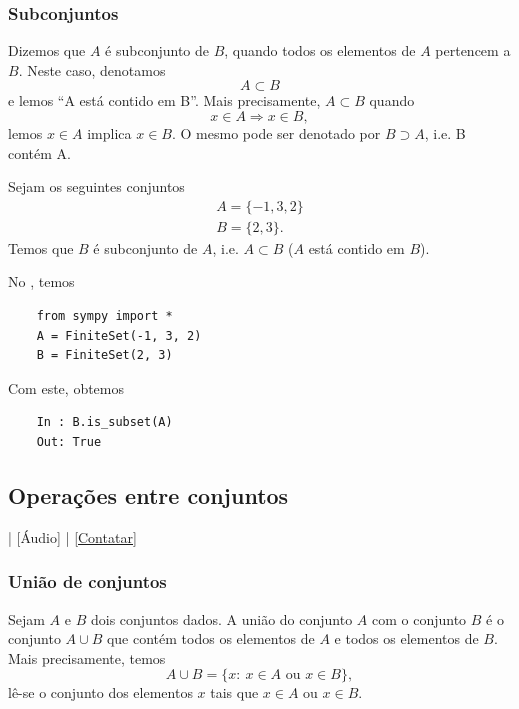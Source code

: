 \subsubsection{Subconjuntos}

Dizemos que $A$ é subconjunto de $B$, quando todos os elementos de $A$ pertencem a $B$. Neste caso, denotamos
\begin{equation}
  A \subset B
\end{equation}
e lemos ``A está contido em B''. Mais precisamente, $A\subset B$ quando
\begin{equation}
  x\in A \Rightarrow x\in B,
\end{equation}
lemos $x\in A$ implica $x\in B$. O mesmo pode ser denotado por $B\supset A$, i.e. B contém A.

\begin{ex}
  Sejam os seguintes conjuntos
  \begin{gather}
    A = \{-1, 3, 2\}\\
    B = \{2, 3\}.
  \end{gather}
  Temos que $B$ é subconjunto de $A$, i.e. $A\subset B$ ($A$ está contido em $B$).
    
  \ifispython
  No \python, temos
  \begin{lstlisting}
    from sympy import *
    A = FiniteSet(-1, 3, 2)
    B = FiniteSet(2, 3)
  \end{lstlisting}
  Com este, obtemos
  \begin{lstlisting}
    In : B.is_subset(A)
    Out: True
  \end{lstlisting}
  \fi
\end{ex}

\subsection{Operações entre conjuntos}

\begin{flushright}
  [Vídeo] | [Áudio] | \href{https://phkonzen.github.io/notas/contato.html}{[Contatar]}
\end{flushright}

\subsubsection{União de conjuntos}

Sejam $A$ e $B$ dois conjuntos dados. A união do conjunto $A$ com o conjunto $B$ é o conjunto $A\cup B$ que contém todos os elementos de $A$ e todos os elementos de $B$. Mais precisamente, temos
\begin{equation}
  A\cup B = \{x:~x\in A \text{ ou } x\in B\},
\end{equation}
lê-se o conjunto dos elementos $x$ tais que $x\in A$ ou $x\in B$.

